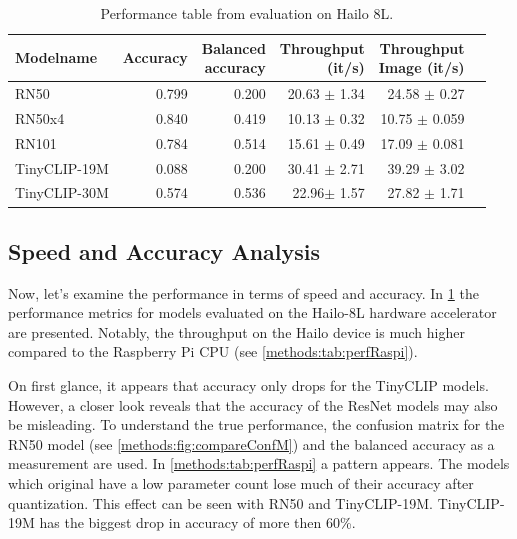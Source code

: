 \begin{table}[]
    \centering
    \begin{tabular}{l|rrrrr}
    \hline
    Modelname & Accuracy &  \makecell{Balanced \\accuracy}&\makecell{Throughput\\(it/s)} & \makecell{Throughput \\ Image (it/s)} & \\ \hline
    RN50 & 0.799 & 0.200 & 20.63 $\pm$ 1.34 & 24.58 $\pm$ 0.27  \\ 
    RN50x4 & 0.840 & 0.419 & 10.13 $\pm$ 0.32 & 10.75  $\pm$ 0.059\\
    RN101 & 0.784& 0.514 & 15.61 $\pm$ 0.49 & 17.09 $\pm$ 0.081\\  
    TinyCLIP-19M & 0.088 & 0.200 & 30.41 $\pm$ 2.71 & 39.29 $\pm$ 3.02 \\ 
    TinyCLIP-30M & 0.574 & 0.536 & 22.96$\pm$ 1.57 & 27.82 $\pm$ 1.71\\ 
    \end{tabular}
    \caption{Performance table from evaluation on Hailo 8L.}
    \label{methods:tab:perfHailo}
\end{table}

\subsection{Speed and Accuracy Analysis}

Now, let's examine the performance in terms of speed and accuracy.
In \cref{methods:tab:perfHailo} the performance metrics for models evaluated on the Hailo-8L hardware accelerator are presented.
Notably, the throughput on the Hailo device is much higher compared to the Raspberry Pi CPU (see \cref{methods:tab:perfRaspi}).

On first glance, it appears that accuracy only drops for the TinyCLIP models.
However, a closer look reveals that the accuracy of the ResNet models may also be misleading.
To understand the true performance, the confusion matrix for the RN50 model (see \cref{methods:fig:compareConfM}) and the balanced accuracy as a measurement are used.
In \cref{methods:tab:perfRaspi} a pattern appears.
The models which original have a low parameter count lose much of their accuracy after quantization.
This effect can be seen with RN50 and TinyCLIP-19M.
TinyCLIP-19M has the biggest drop in accuracy of more then 60\%.


